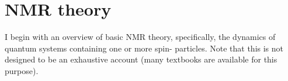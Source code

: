 \chapter{NMR theory}
\label{chpt:theory}

I begin with an overview of basic NMR theory, specifically, the dynamics of quantum systems containing one or more spin-\half{} particles.
Note that this is not designed to be an exhaustive account (many textbooks are available for this purpose).






\printbibliography[heading=subbibnumbered]{}

